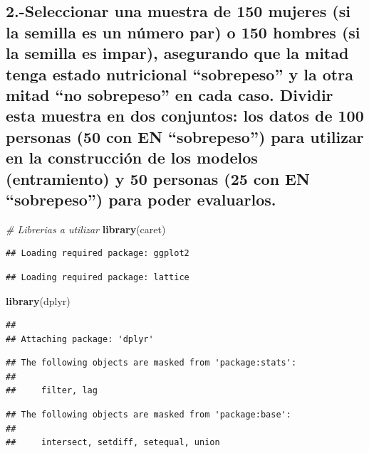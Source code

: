 \documentclass[
]{article}
\newenvironment{Shaded}{\begin{snugshade}}{\end{snugshade}}
\newcommand{\CommentTok}[1]{\textcolor[rgb]{0.56,0.35,0.01}{\textit{#1}}}
\newcommand{\FunctionTok}[1]{\textcolor[rgb]{0.13,0.29,0.53}{\textbf{#1}}}
\newcommand{\NormalTok}[1]{#1}
\begin{document}
\subsection{2.-Seleccionar una muestra de 150 mujeres (si la semilla es
un número par) o 150 hombres (si la semilla es impar), asegurando que la
mitad tenga estado nutricional ``sobrepeso'' y la otra mitad ``no
sobrepeso'' en cada caso. Dividir esta muestra en dos conjuntos: los
datos de 100 personas (50 con EN ``sobrepeso'') para utilizar en la
construcción de los modelos (entramiento) y 50 personas (25 con EN
``sobrepeso'') para poder
evaluarlos.}\label{seleccionar-una-muestra-de-150-mujeres-si-la-semilla-es-un-nuxfamero-par-o-150-hombres-si-la-semilla-es-impar-asegurando-que-la-mitad-tenga-estado-nutricional-sobrepeso-y-la-otra-mitad-no-sobrepeso-en-cada-caso.-dividir-esta-muestra-en-dos-conjuntos-los-datos-de-100-personas-50-con-en-sobrepeso-para-utilizar-en-la-construcciuxf3n-de-los-modelos-entramiento-y-50-personas-25-con-en-sobrepeso-para-poder-evaluarlos.}

\begin{Shaded}
\begin{Highlighting}[]
\CommentTok{\# Librerias a utilizar}
\FunctionTok{library}\NormalTok{(caret) }
\end{Highlighting}
\end{Shaded}

\begin{verbatim}
## Loading required package: ggplot2
\end{verbatim}

\begin{verbatim}
## Loading required package: lattice
\end{verbatim}

\begin{Shaded}
\begin{Highlighting}[]
\FunctionTok{library}\NormalTok{(dplyr) }
\end{Highlighting}
\end{Shaded}

\begin{verbatim}
## 
## Attaching package: 'dplyr'
\end{verbatim}

\begin{verbatim}
## The following objects are masked from 'package:stats':
## 
##     filter, lag
\end{verbatim}

\begin{verbatim}
## The following objects are masked from 'package:base':
## 
##     intersect, setdiff, setequal, union
\end{verbatim}
\end{document}

